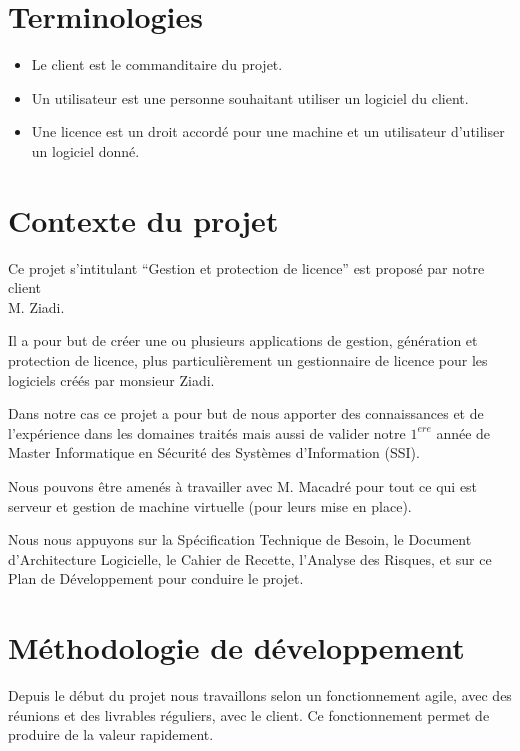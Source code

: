 \chapter{Terminologies}

\begin{itemize}
	\item Le client est le commanditaire du projet.
	\item Un utilisateur est une personne souhaitant utiliser un logiciel du client. 
	\item Une licence est un droit accordé pour une machine et un utilisateur d'utiliser un logiciel donné.
\end{itemize}

\chapter{Contexte du projet}

Ce projet s’intitulant “Gestion et protection de licence” est proposé par notre client \\M.
Ziadi.\newline

Il a pour but de créer une ou plusieurs applications de gestion, génération et protection 
de licence, plus particulièrement un gestionnaire de licence pour les logiciels créés par monsieur
Ziadi.\newline

Dans notre cas ce projet a pour but de nous apporter des connaissances et de l'expérience dans les domaines traités  mais aussi de valider notre $1^{ere}$ année de Master Informatique en Sécurité des Systèmes d’Information (SSI).\newline

Nous pouvons être amenés à travailler avec M. Macadré pour tout ce qui est
serveur et gestion de machine virtuelle (pour leurs mise en place).

Nous nous appuyons sur la Spécification Technique de Besoin, le Document d'Architecture
Logicielle, le Cahier de Recette, l’Analyse des Risques, et sur ce Plan de Développement
pour conduire le projet.

\chapter{Méthodologie de développement}

Depuis le début du projet nous travaillons selon un fonctionnement agile, avec des
réunions et des livrables réguliers, avec le client. Ce fonctionnement permet de produire de
la valeur rapidement.\newline

